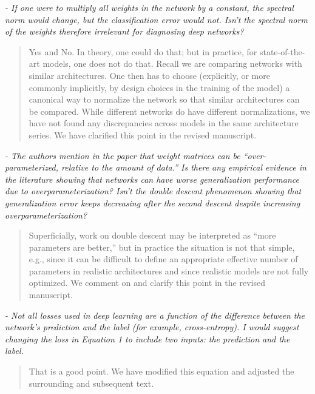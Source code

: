\documentclass[11pt]{article}
\begin{document}
\noindent
\emph{%
- If one were to multiply all weights in the network by a constant, the spectral norm would change, but the classification error would not. Isn't the spectral norm of the weights therefore irrelevant for diagnosing deep networks?
}

\begin{quote}
Yes and No.  
In theory, one could do that; but in practice, for state-of-the-art models, one does not do that.
Recall we are comparing networks with similar architectures.
One then has to choose (explicitly, or more commonly implicitly, by design choices in the training of the model) a canonical way to normalize the network so that similar architectures can be compared.
While different networks do have different normalizations, we have not found any discrepancies across 
models in the same architecture series.
We have clarified this point
in the revised manuscript.
\end{quote}

\noindent
\emph{%
- The authors mention in the paper that weight matrices can be ``over-parameterized, relative to the amount of data.'' Is there any empirical evidence in the literature showing that networks can have worse generalization performance due to overparameterization? Isn't the double descent phenomenon showing that generalization error keeps decreasing after the second descent despite increasing overparameterization?
}

\begin{quote}
Superficially, work on double descent may be interpreted as ``more parameters are better,'' but in practice the situation is not that simple, e.g., since it can be difficult to define an appropriate effective number of parameters in realistic architectures and since realistic models are not fully optimized.
We comment on and clarify this point 
in the revised manuscript.
\end{quote}

\noindent
\emph{%
- Not all losses used in deep learning are a function of the difference between the network's prediction and the label (for example, cross-entropy). I would suggest changing the loss in Equation 1 to include two inputs: the prediction and the label.
} 

\begin{quote}
That is a good point.
We have modified this equation and adjusted the surrounding and subsequent text.
\end{quote}



%
{\small
%

%
}
\end{document}
